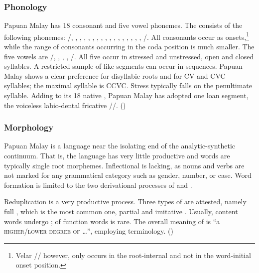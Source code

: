 \subsubsection[Phonology]{Phonology}\label{Para_1.6.1.1}
Papuan Malay has 18 consonant and five vowel phonemes. The  consists of the following phonemes: /, , , , , , , , , , , , , , , , , /. All consonants occur as onsets,\footnote{Velar // however, only occurs in the root-internal and not in the word-initial onset position.} while the range of consonants occurring in the coda position is much smaller. The five vowels are /, , , , /. All five occur in stressed and unstressed, open and closed syllables. A restricted sample of like segments can occur in sequences. Papuan Malay shows a clear preference for disyllabic roots and for CV and CVC syllables; the maximal syllable is CCVC. Stress typically falls on the penultimate syllable. Adding to its 18 native , Papuan Malay has adopted one loan segment, the voiceless labio-dental fricative //. ()


\subsubsection[Morphology]{Morphology}\label{Para_1.6.1.2}
Papuan Malay is a language near the isolating end of the analytic-synthetic continuum. That is, the language has very little productive  and words are typically single root morphemes. Inflectional  is lacking, as nouns and verbs are not marked for any grammatical category such as gender, number, or case. Word formation is limited to the two derivational processes of  and .



Reduplication is a very productive process. Three types of  are attested, namely full , which is the most common one, partial and imitative . Usually, content words undergo ;  of function words is rare. The overall meaning of  is  ``a \textsc{higher}/\textsc{lower} \textsc{degree} \textsc{of} \ldots'', employing  terminology. ()




